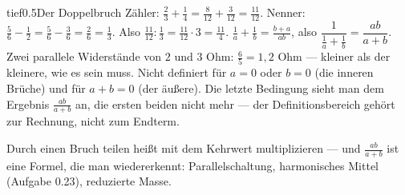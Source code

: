 \begin{loesungkarte}{tief}{0.5}{Der Doppelbruch}
Zähler: $\frac23 + \frac14 = \frac8{12} + \frac3{12} = \frac{11}{12}$. Nenner: $\frac56 - \frac12 = \frac56 - \frac36 = \frac26 = \frac13$. Also $\frac{11}{12} : \frac13 = \frac{11}{12}\cdot3 = \frac{11}4$.
$\frac1a + \frac1b = \frac{b + a}{ab}$, also $\dfrac1{\frac1a + \frac1b} = \dfrac{ab}{a + b}$. Zwei parallele Widerstände von $2$ und $3$ Ohm: $\frac65 = 1{,}2$ Ohm --- kleiner als der kleinere, wie es sein muss.
Nicht definiert für $a = 0$ oder $b = 0$ (die inneren Brüche) und für $a + b = 0$ (der äußere). Die letzte Bedingung sieht man dem Ergebnis $\frac{ab}{a + b}$ an, die ersten beiden nicht mehr --- der Definitionsbereich gehört zur Rechnung, nicht zum Endterm.
\begin{mitnehmen}\kastentext
Durch einen Bruch teilen heißt mit dem Kehrwert multiplizieren --- und $\frac{ab}{a + b}$ ist eine Formel, die man wiedererkennt: Parallelschaltung, harmonisches Mittel (Aufgabe 0.23), reduzierte Masse.
\end{mitnehmen}
\end{loesungkarte}

